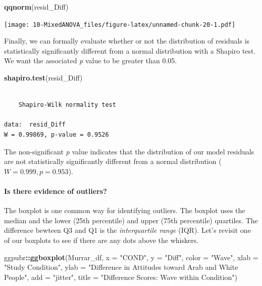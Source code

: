 \documentclass[
  11pt,
]{book}
\newenvironment{Shaded}{\begin{snugshade}}{\end{snugshade}}
\newcommand{\AttributeTok}[1]{\textcolor[rgb]{0.27,0.27,0.27}{#1}}
\newcommand{\FunctionTok}[1]{\textcolor[rgb]{0.27,0.27,0.27}{\textbf{#1}}}
\newcommand{\NormalTok}[1]{#1}
\newcommand{\SpecialCharTok}[1]{\textcolor[rgb]{0.43,0.43,0.43}{\textbf{#1}}}
\newcommand{\StringTok}[1]{\textcolor[rgb]{0.5,0.5,0.5}{#1}}
\begin{document}
\begin{Shaded}
\begin{Highlighting}[]
\FunctionTok{qqnorm}\NormalTok{(resid\_Diff)}
\end{Highlighting}
\end{Shaded}

\texttt{[image: 10-MixedANOVA\_files/figure-latex/unnamed-chunk-20-1.pdf]}

Finally, we can formally evaluate whether or not the distribution of residuals is statistically significantly different from a normal distribution with a Shapiro test. We want the associated \emph{p} value to be greater than 0.05.

\begin{Shaded}
\begin{Highlighting}[]
\FunctionTok{shapiro.test}\NormalTok{(resid\_Diff)}
\end{Highlighting}
\end{Shaded}

\begin{verbatim}

    Shapiro-Wilk normality test

data:  resid_Diff
W = 0.99869, p-value = 0.9526
\end{verbatim}

The non-significant \emph{p} value indicates that the distribution of our model residuals are not statistically significantly different from a normal distribution (\(W = 0.999, p = 0.953\)).

\hypertarget{is-there-evidence-of-outliers}{%
\paragraph{Is there evidence of outliers?}\label{is-there-evidence-of-outliers}}

The boxplot is one common way for identifying outliers. The boxplot uses the median and the lower (25th percentile) and upper (75th percentile) quartiles. The difference bewteen Q3 and Q1 is the \emph{interquartile range} (IQR). Let's revisit one of our boxplots to see if there are any dots above the whiskers.

\begin{Shaded}
\begin{Highlighting}[]
\NormalTok{ggpubr}\SpecialCharTok{::}\FunctionTok{ggboxplot}\NormalTok{(Murrar\_df, }\AttributeTok{x =} \StringTok{"COND"}\NormalTok{, }\AttributeTok{y =} \StringTok{"Diff"}\NormalTok{, }\AttributeTok{color =} \StringTok{"Wave"}\NormalTok{, }\AttributeTok{xlab =} \StringTok{"Study Condition"}\NormalTok{,}
    \AttributeTok{ylab =} \StringTok{"Difference in Attitudes toward Arab and White People"}\NormalTok{, }\AttributeTok{add =} \StringTok{"jitter"}\NormalTok{,}
    \AttributeTok{title =} \StringTok{"Difference Scores: Wave within Condition"}\NormalTok{)}
\end{Highlighting}
\end{Shaded}
\end{document}
